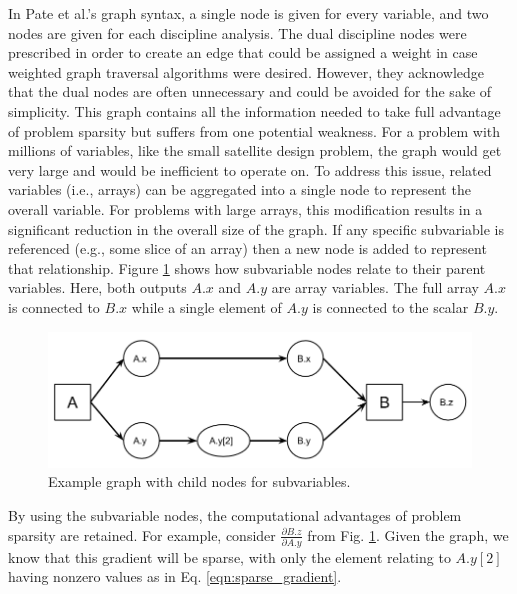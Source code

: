 \documentclass[]{aiaa-tc} %
\begin{document}
    In Pate et al.'s graph syntax, a single node is given for every variable, and two nodes are given
    for each discipline analysis. The dual discipline nodes were prescribed in order to create an edge
    that could be assigned a weight in case weighted graph traversal algorithms were desired. However,
    they acknowledge that the dual nodes are often unnecessary and could be avoided for the sake of simplicity.
    This graph contains all the information needed to take full advantage of problem sparsity but suffers from one potential
    weakness. For a problem with millions of  variables, like the small satellite design problem,
    the graph would get very large and would be inefficient to operate on. To address this issue,
    related variables (i.e., arrays) can be aggregated into a single node to represent the
    overall variable. For problems with large arrays, this modification results in a significant reduction
    in the overall size of the graph. If any specific subvariable is referenced (e.g., some slice of an array)
    then a new node is added to represent that relationship.
    Figure \ref{fig:subvars} shows how subvariable nodes relate to their parent variables. Here,
    both outputs $A.x$ and $A.y$ are array variables. The full array $A.x$ is connected to
    $B.x$ while a single element of $A.y$ is connected to the scalar $B.y$.

    \begin{figure}[!htb]\begin{center}
      \includegraphics[width=.8\textwidth]{images/sub-var-node-graph}
      \caption{ Example graph with child nodes for subvariables. \label{fig:subvars}}
    \end{center}\end{figure}

    By using the subvariable nodes, the computational advantages of problem sparsity are retained. For example,
    consider $\frac{\partial B.z}{\partial A.y}$ from Fig. \ref{fig:subvars}. Given the graph, we know that
    this gradient will be sparse, with only the element relating to $A.y[2]$ having nonzero values as in Eq.  \ref{eqn:sparse_gradient}.
\end{document}
